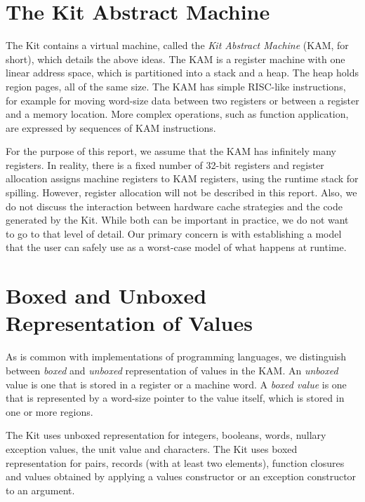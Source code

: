 \documentclass[12pt]{book}
\begin{document}
\section{The Kit Abstract Machine}
The Kit contains a virtual machine, called
the {\em Kit Abstract Machine} (KAM, for short), which details the
above ideas. The KAM is a register machine with one linear address
space, which is partitioned into a stack and a heap. The heap holds
region pages, all of the same size.  The KAM has simple RISC-like
instructions, for example for moving word-size data between two
registers or between a register and a memory location.  More complex
operations, such as function application, are expressed by sequences
of KAM instructions.

For the purpose of this report,
we assume that the KAM has infinitely many registers.
In reality, there is a fixed number of 32-bit registers and
register allocation assigns machine registers to KAM registers, using the runtime
stack for spilling. However, register allocation will not be described in this report.
Also, we do not discuss the interaction between hardware cache strategies and
the code generated by the Kit. While both can be important in practice, we do not want
to go to that level of detail. Our primary concern is with establishing a model that
the user can safely use as a worst-case model of what happens at runtime.

\section{Boxed and Unboxed Representation of Values}
\label{boxing.sec}
As is common with implementations of programming languages, 
we distinguish between {\em boxed} and {\em unboxed} representation
of values in the KAM.
An {\em unboxed} value is one that is stored in a register or
a machine word. A {\em boxed value} is one that is represented by
a word-size pointer to the value itself, which is stored in one or more
regions.

The Kit uses unboxed representation for
integers, booleans, words, nullary exception values, 
the unit value and characters. 
The Kit uses boxed representation for pairs, records 
(with at least two elements), 
function closures and values obtained by applying a values constructor
or an exception constructor to an argument.
\end{document}
